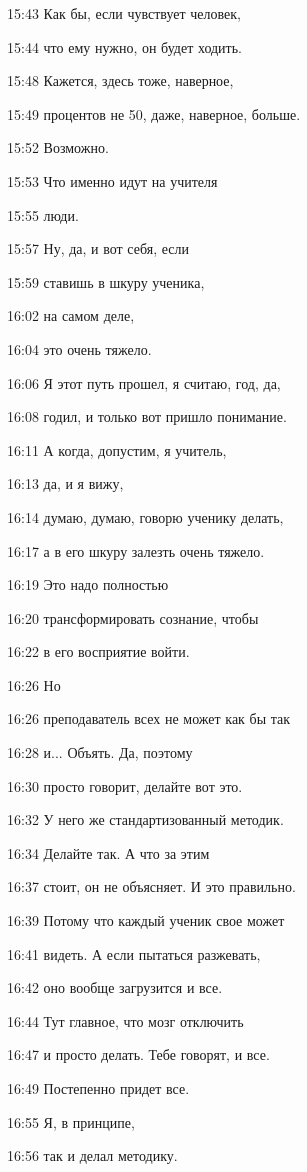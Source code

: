 15:43
Как бы, если чувствует человек,

15:44
что ему нужно, он будет ходить.

15:48
Кажется, здесь тоже, наверное,

15:49
процентов не 50, даже, наверное, больше.

15:52
Возможно.

15:53
Что именно идут на учителя

15:55
люди.

15:57
Ну, да, и вот себя, если

15:59
ставишь в шкуру ученика,

16:02
на самом деле,

16:04
это очень тяжело.

16:06
Я этот путь прошел, я считаю, год, да,

16:08
годил, и только вот пришло понимание.

16:11
А когда, допустим, я учитель,

16:13
да, и я вижу,

16:14
думаю, думаю, говорю ученику делать,

16:17
а в его шкуру залезть очень тяжело.

16:19
Это надо полностью

16:20
трансформировать сознание, чтобы

16:22
в его восприятие войти.

16:26
Но

16:26
преподаватель всех не может как бы так

16:28
и... Объять. Да, поэтому

16:30
просто говорит, делайте вот это.

16:32
У него же стандартизованный методик.

16:34
Делайте так. А что за этим

16:37
стоит, он не объясняет. И это правильно.

16:39
Потому что каждый ученик свое может

16:41
видеть. А если пытаться разжевать,

16:42
оно вообще загрузится и все.

16:44
Тут главное, что мозг отключить

16:47
и просто делать. Тебе говорят, и все.

16:49
Постепенно придет все.

16:55
Я, в принципе,

16:56
так и делал методику.

